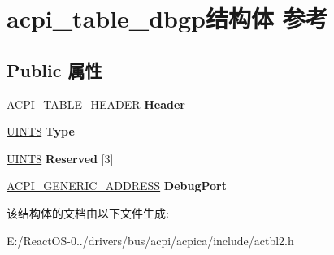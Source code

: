\hypertarget{structacpi__table__dbgp}{}\section{acpi\+\_\+table\+\_\+dbgp结构体 参考}
\label{structacpi__table__dbgp}
\subsection*{Public 属性}
\begin{DoxyCompactItemize}
\item 
\mbox{\label{structacpi__table__dbgp_a318bf24b9dc60b74e4119cf30a5322f6}} 
\hyperlink{structacpi__table__header}{A\+C\+P\+I\+\_\+\+T\+A\+B\+L\+E\+\_\+\+H\+E\+A\+D\+ER} {\bfseries Header}
\item 
\mbox{\label{structacpi__table__dbgp_a50d79cf178cf7e0d5a0ffc24b7d593c5}} 
\hyperlink{_processor_bind_8h_ab27e9918b538ce9d8ca692479b375b6a}{U\+I\+N\+T8} {\bfseries Type}
\item 
\mbox{\label{structacpi__table__dbgp_abc9269f0992438efdaa0e1578c9dd1c9}} 
\hyperlink{_processor_bind_8h_ab27e9918b538ce9d8ca692479b375b6a}{U\+I\+N\+T8} {\bfseries Reserved} \mbox{[}3\mbox{]}
\item 
\mbox{\label{structacpi__table__dbgp_aa8cc15cef830b0e655926686dc5616b9}} 
\hyperlink{structacpi__generic__address}{A\+C\+P\+I\+\_\+\+G\+E\+N\+E\+R\+I\+C\+\_\+\+A\+D\+D\+R\+E\+SS} {\bfseries Debug\+Port}
\end{DoxyCompactItemize}


该结构体的文档由以下文件生成\+:\begin{DoxyCompactItemize}
\item 
E\+:/\+React\+O\+S-\/0../drivers/bus/acpi/acpica/include/actbl2.\+h\end{DoxyCompactItemize}
